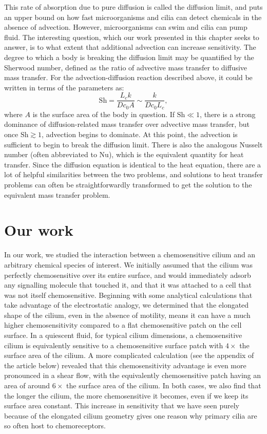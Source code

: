 This rate of absorption due to pure diffusion is called the diffusion limit, and puts an upper bound on how fast microorganisms and cilia can detect chemicals in the absence of advection. However, microorganisms can swim and cilia can pump fluid. The interesting question, which our work presented in this chapter seeks to answer, is to what extent that additional advection can increase sensitivity. The degree to which a body is breaking the diffusion limit may be quantified by the Sherwood number, defined as the ratio of advective mass transfer to diffusive mass transfer. For the advection-diffusion reaction described above, it could be written in terms of the parameters as:
\begin{equation}
    \mathrm{Sh} = \frac{L_c k}{Dc_0 A} \sim \frac{k}{Dc_0L_c},
\end{equation}
where $A$ is the surface area of the body in question. If $\mathrm{Sh}\ll 1$, there is a strong dominance of diffusion-related mass transfer over advective mass transfer, but once $\mathrm{Sh}\gtrsim 1$, advection begins to dominate. At this point, the advection is sufficient to begin to break the diffusion limit. There is also the analogous Nusselt number (often abbreviated to $\mathrm{Nu}$), which is the equivalent quantity for heat transfer. Since the diffusion equation is identical to the heat equation, there are a lot of helpful similarities between the two problems, and solutions to heat transfer problems can often be straightforwardly transformed to get the solution to the equivalent mass transfer problem.

\section{Our work}
In our work, we studied the interaction between a chemosensitive cilium and an arbitrary chemical species of interest. We initially assumed that the cilium was perfectly chemosensitive over its entire surface, and would immediately adsorb any signalling molecule that touched it, and that it was attached to a cell that was not itself chemosensitive. Beginning with some analytical calculations that take advantage of the electrostatic analogy, we determined that the elongated shape of the cilium, even in the absence of motility, means it can have a much higher chemosensitivity compared to a flat chemosensitive patch on the cell surface. In a quiescent fluid, for typical cilium dimensions, a chemosensitive cilium is equivalently sensitive to a chemosensitive surface patch with $4\times$ the surface area of the cilium. A more complicated calculation (see the appendix of the article below) revealed that this chemosensitivity advantage is even more pronounced in a shear flow, with the equivalently chemosensitive patch having an area of around $6\times$ the surface area of the cilium. In both cases, we also find that the longer the cilium, the more chemosensitive it becomes, even if we keep its surface area constant. This increase in sensitivity that we have seen purely because of the elongated cilium geometry gives one reason why primary cilia are so often host to chemoreceptors.

